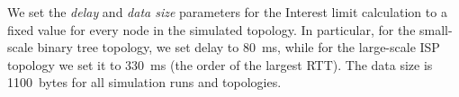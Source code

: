 We set the \emph{delay} and \emph{data size} parameters for the Interest limit calculation to a fixed value for every node in the simulated topology. In particular, for the small-scale binary tree topology, we set delay to 80~ms, while for the large-scale ISP topology we set it to 330~ms (the order of the largest RTT). The data size is 1100~bytes for all simulation runs and topologies.





% 

